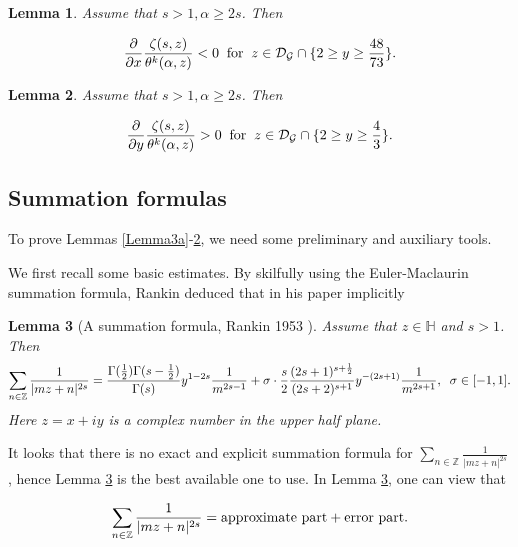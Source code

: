 \documentclass[reqno,english]{amsart}
\newtheorem{lemma}{Lemma}[section]
\newtheorem{open problem}{Open Problem}[section]
\newtheorem{open question}{Open Question}[section]
\newtheorem{open questions on hexagonal lattice}{Open Questions on hexagonal lattice}[section]
\begin{document}
\begin{lemma}\label{Lemma3b} Assume that $s>1, \alpha\geq 2s$. Then

\begin{equation}\aligned\nonumber
\frac{\partial}{\partial x}\frac{\zeta(s,z)}{\theta^k(\alpha,z)}<0\;\;\hbox{for}\;\;z\in\mathcal{D}_{\mathcal{G}}\cap\{2\geq y\geq \frac{48}{73}\}.
 \endaligned\end{equation}

\end{lemma}

\begin{lemma}\label{Lemma3c} Assume that $s>1, \alpha\geq 2s$. Then

\begin{equation}\aligned\nonumber
\frac{\partial}{\partial y}\frac{\zeta(s,z)}{\theta^k(\alpha,z)}>0\;\;\hbox{for}\;\;z\in\mathcal{D}_{\mathcal{G}}\cap\{2\geq y\geq \frac{4}{3}\}.
 \endaligned\end{equation}

\end{lemma}



\subsection{Summation formulas}
To prove Lemmas \ref{Lemma3a}-\ref{Lemma3c}, we need some preliminary and auxiliary tools.


We first recall some basic estimates. By skilfully using the Euler-Maclaurin summation formula, Rankin deduced that in his paper implicitly
\begin{lemma}[A summation formula, Rankin 1953 \cite{Ran1953}]\label{Rankin1} Assume that $z\in \mathbb{H}$ and $s>1$. Then
\begin{equation}\aligned\nonumber
\sum_{n\in\mathbb{Z}}\frac{1}{|mz+n|^{2s}}=\frac{\Gamma(\frac{1}{2})\Gamma(s-\frac{1}{2})}{\Gamma(s)}y^{1-2s}\frac{1}{m^{2s-1}}
+\sigma\cdot\frac{s}{2}\frac{(2s+1)^{s+\frac{1}{2}}}{(2s+2)^{s+1}}y^{-(2s+1)}\frac{1}{m^{2s+1}},\;\;\sigma\in[-1,1].
 \endaligned\end{equation}
Here $z=x+iy$ is a complex number in the upper half plane.
\end{lemma}
It looks that there is no exact and explicit summation formula for $\sum_{n\in\mathbb{Z}}\frac{1}{|mz+n|^{2s}}$, hence Lemma \ref{Rankin1} is the best available one to use. In Lemma \ref{Rankin1}, one can view that

\begin{equation}\aligned\nonumber
\sum_{n\in\mathbb{Z}}\frac{1}{|mz+n|^{2s}}=\hbox{approximate part}+\hbox{error part}.
 \endaligned\end{equation}
\end{document}
